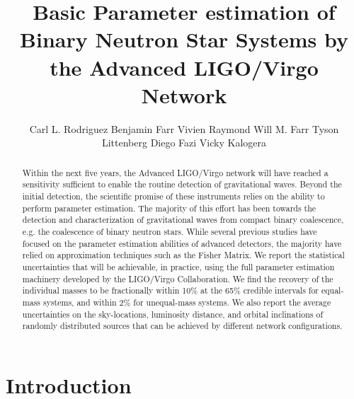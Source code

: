 \documentclass[11pt,a4paper]{emulateapj}
\begin{document}
\title{Basic Parameter estimation of Binary Neutron Star Systems by the Advanced LIGO/Virgo Network}
\author{Carl L. Rodriguez 
Benjamin Farr 
Vivien Raymond 
Will M. Farr 
Tyson Littenberg
Diego Fazi
Vicky Kalogera}




\begin{abstract}

Within the next five years, the Advanced LIGO/Virgo network will have reached a sensitivity sufficient to enable the routine
 detection of gravitational waves.  Beyond the initial detection, the scientific promise of these instruments relies on the ability to perform parameter estimation. The majority of this effort has been towards the detection
   and characterization of gravitational waves from compact binary coalescence, e.g. the coalescence of binary 
   neutron stars.  While several previous studies have focused on the parameter estimation abilities of advanced detectors, 
   the majority have relied on approximation techniques such as the Fisher Matrix.  We report the statistical 
   uncertainties that will be achievable, in practice, using the full parameter estimation machinery developed by the  
   LIGO/Virgo Collaboration.  We find the recovery of the individual masses to be fractionally within 
   10\% at the 65\% credible intervals for equal-mass systems, and within 2\% for unequal-mass systems.
     We also report the average uncertainties on the sky-locations, luminosity distance, and orbital inclinations of randomly 
     distributed sources that can be achieved by different network configurations.
\end{abstract}

\maketitle
\section{Introduction}
\end{document}
